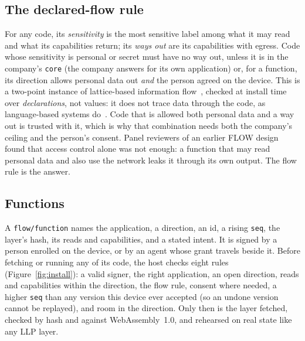 \documentclass[10pt,twocolumn]{article}
\newcommand{\code}[1]{\texttt{#1}}
\begin{document}
\subsection{The declared-flow rule}

For any code, its \emph{sensitivity} is the most sensitive label among what it may read and what its
capabilities return; its \emph{ways out} are its capabilities with egress. Code whose sensitivity is
personal or secret must have no way out, unless it is in the company's \code{core} (the company
answers for its own application) or, for a function, its direction allows personal data out
\emph{and} the person agreed on the device. This is a two-point instance of lattice-based information
flow~\cite{denning1976lattice}, checked at install time over \emph{declarations}, not values: it does
not trace data through the code, as language-based systems do~\cite{myers1997dlm}. Code that is
allowed both personal data and a way out is trusted with it, which is why that combination needs
both the company's ceiling and the person's consent. Panel reviewers of an earlier FLOW design
found that access control alone was not enough: a function that may read personal data and also
use the network leaks it through its own output. The flow rule is the answer.

\subsection{Functions}

A \code{flow/function} names the application, a direction, an id, a rising \code{seq}, the layer's
hash, its reads and capabilities, and a stated intent. It is signed by a person enrolled on the
device, or by an agent whose grant travels beside it. Before fetching or running any of its code,
the host checks eight rules (Figure~\ref{fig:install}): a valid signer, the right application, an
open direction, reads and capabilities within the direction, the flow rule, consent where needed, a
higher \code{seq} than any version this device ever accepted (so an undone version cannot be
replayed), and room in the direction. Only then is the layer fetched, checked by hash and against
WebAssembly~1.0, and rehearsed on real state like any LLP layer.
\end{document}
